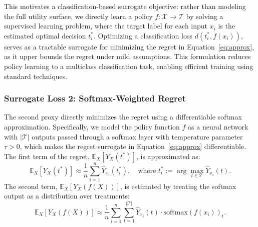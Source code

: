 \documentclass{article}
\theoremstyle{remark}
\begin{document}
This motivates a classification-based surrogate objective: rather than modeling the full utility surface, we directly learn a policy $f : \mathcal{X} \to \mathcal{T}$ by solving a supervised learning problem, where the target label for each input $x_i$ is the estimated optimal decision $t_i^*$. Optimizing a classification loss $d(t_i^*, f(x_i))$, serves as a tractable surrogate for minimizing the regret in Equation~\eqref{eq:approx}, as it upper bounds the regret under mild assumptions. This formulation reduces policy learning to a multiclass classification task, enabling efficient training using standard techniques.


\subsubsection{Surrogate Loss 2: Softmax-Weighted Regret}



The second proxy directly minimizes the regret using a differentiable softmax approximation. Specifically, we model the policy function \( f \) as a neural network with \( |\mathcal{T}| \) outputs passed through a softmax layer with temperature parameter \( \tau > 0 \), which makes the regret surrogate in Equation~\eqref{eq:approx} differentiable. The first term of the regret, \( \mathbb{E}_X[Y_X(t^*)] \), is approximated as:
\begin{equation}
    \mathbb{E}_X[Y_X(t^*)] \approx \frac{1}{n} \sum_{i=1}^n \hat{Y}_{x_i}(t_i^*),
    \quad \text{where } t_i^* := \arg\max_{t \in \mathcal{T}} \hat{Y}_{x_i}(t).
\end{equation}
The second term, \( \mathbb{E}_X[Y_X(f(X))] \), is estimated by treating the softmax output as a distribution over treatments:
\begin{equation}
    \mathbb{E}_X[Y_X(f(X))] \approx \frac{1}{n} \sum_{i=1}^n \sum_{t=1}^{|\mathcal{T}|} 
    \hat{Y}_{x_i}(t) \cdot \mathrm{softmax}(f(x_i))_t.
\end{equation}




\end{document}

